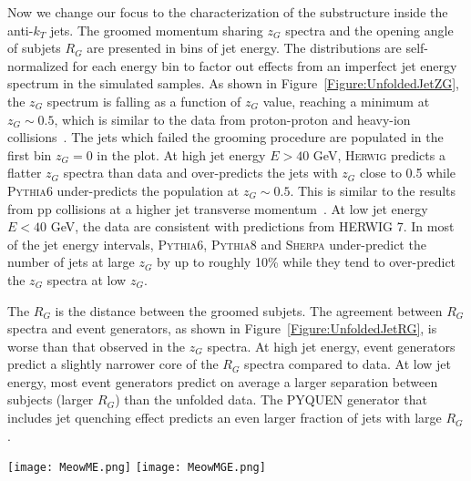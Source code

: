 \documentclass[aps,preprint,superscriptaddress,groupedaddress]{revtex4}  %
\newcommand{\zg}{\ensuremath{z_G}\xspace}
\newcommand{\rg}{\ensuremath{R_G}\xspace}
\newcommand{\Rg}{\ensuremath{R_G}\xspace}
\newcommand{\sherpa}{\textsc{Sherpa}\xspace}
\newcommand{\herwig}{\textsc{Herwig}\xspace}
\newcommand{\pythia}[1]{\textsc{Pythia}{#1}\xspace}
\begin{document}
Now we change our focus to the characterization of the substructure inside the anti-$k_T$ jets. The groomed momentum sharing $\zg$ spectra and the opening angle of subjets $\Rg$ are presented in bins of jet energy.  The distributions are self-normalized for each energy bin to factor out effects from an imperfect jet energy spectrum in the simulated samples.  As shown in Figure~\ref{Figure:UnfoldedJetZG}, the $\zg$ spectrum is falling as a function of $\zg$ value, reaching a minimum at $\zg\sim 0.5$, which is similar to the data from proton-proton and heavy-ion collisions~\cite{CMS:2017qlm}. The jets which failed the grooming procedure are populated in the first bin $\zg = 0$ in the plot. At high jet energy $E>40$ GeV, \herwig predicts a flatter $\zg$ spectra than data and over-predicts the jets with $\zg$ close to 0.5 while \pythia{6} under-predicts the population at $\zg\sim 0.5$. This is similar to the results from pp collisions at a higher jet transverse momentum~\cite{CMS:2017qlm}. At low jet energy $E<40$ GeV, the data are consistent with predictions from HERWIG 7. In most of the jet energy intervals, \pythia{6}, \pythia{8} and \sherpa under-predict the number of jets at large $\zg$ by up to roughly 10\% while they tend to over-predict the $\zg$ spectra at low $\zg$. 

The $\rg$ is the distance between the groomed subjets. The agreement between $\Rg$ spectra and event generators, as shown in Figure~\ref{Figure:UnfoldedJetRG}, is worse than that observed in the $\zg$ spectra. At high jet energy, event generators predict a slightly narrower core of the $\Rg$ spectra compared to data. At low jet energy, most event generators predict on average a larger separation between subjects (larger $\Rg$) than the unfolded data. The PYQUEN generator that includes jet quenching effect predicts an even larger fraction of jets with large $\Rg$.


\begin{figure*}
    \centering
    \texttt{[image: MeowME.png]}
    \texttt{[image: MeowMGE.png]}
    \caption{Measured $M/E$ and $M_G/E$ spectra in bins of jet $E$.  The spectrum is self-normalized for each $E$ interval.  The fraction of jets completely groomed away are included in the first bin of each panel.  The data is also compared with predictions from \pythia{6} (red), \pythia{8} (blue), \herwig (green), and \sherpa (purple) generators.}
    \label{Figure:UnfoldedJetMass}
\end{figure*}
\end{document}
